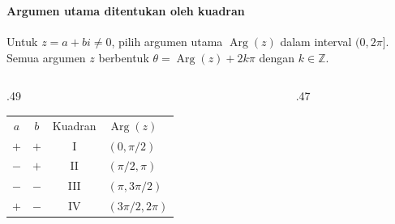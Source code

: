 \documentclass{../../kalkulus-ppt}
\DeclareMathOperator{\Arg}{Arg}
\begin{document}
\begin{frame}
    \frametitle{\insertsection}
    \framesubtitle{Argumen utama ditentukan oleh kuadran}
    Untuk $z=a+bi\ne0$, pilih argumen utama $\Arg(z)$ dalam interval $(0,2\pi]$.
    Semua argumen $z$ berbentuk $\theta=\Arg(z)+2k\pi$ dengan $k\in\mathbb Z$.
    \par\smallskip
    \begin{columns}[c,onlytextwidth]
        \begin{column}{.49\textwidth}
            \centering
            \begin{tabular}{cccl}
                \rowcolor{HIMAtua!20}
                $a$ & $b$ & Kuadran & $\Arg(z)$\\
                $+$ & $+$ & I   & $(0,\pi/2)$\\
                $-$ & $+$ & II  & $(\pi/2,\pi)$\\
                $-$ & $-$ & III & $(\pi,3\pi/2)$\\
                $+$ & $-$ & IV  & $(3\pi/2,2\pi)$
            \end{tabular}
        \end{column}
        \begin{column}{.47\textwidth}
        \end{column}
    \end{columns}
    \par\smallskip
\end{frame}
\end{document}
